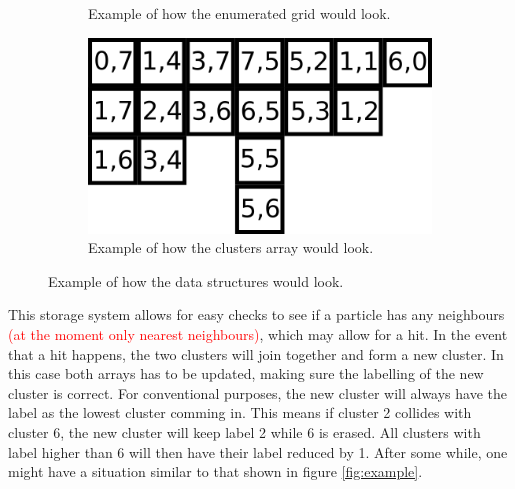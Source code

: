 \begin{figure}[h]
\begin{center}
\begin{subfigure}[t]{0.3\textwidth}
			\caption{Example of how the enumerated grid would look.  }
			\label{fig:num_grid_example}
		\end{subfigure}
		\begin{subfigure}[t]{0.3\textwidth}
			\includegraphics[width = \textwidth]{fig/clusters_example_schematic}
			\caption{Example of how the clusters array would look. }
			\label{fig:clusters_example_schematic}
		\end{subfigure}
		\caption{Example of how the data structures would look.}
		\label{fig:arrays}
	\end{center}
\end{figure}

This storage system allows for easy checks to see if a particle has any neighbours \textcolor{red}{(at the moment only nearest neighbours)}, which may allow for a hit. In the event that a hit happens, the two clusters will join together and form a new cluster. In this case both arrays has to be updated, making sure the labelling of the new cluster is correct. For conventional purposes, the new cluster will always have the label as the lowest cluster comming in. This means if cluster 2 collides with cluster 6, the new cluster will keep label 2 while 6 is erased. All clusters with label higher than 6 will then have their label reduced by 1. After some while, one might have a situation similar to that shown in figure \ref{fig:example}.